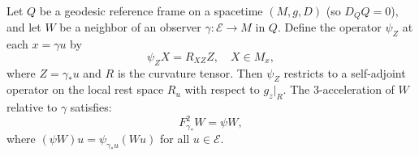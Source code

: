Let $Q$ be a geodesic reference frame on a spacetime $(M, g, D)$ (so $D_Q Q = 0$), and let $W$ be a neighbor of an observer $\gamma: \mathcal{E} \to M$ in $Q$. Define the operator $\psi_Z$ at each $x = \gamma u$ by
$$\psi_Z X = R_{X Z} Z, \quad X \in M_x,$$
where $Z = \gamma_* u$ and $R$ is the curvature tensor. Then $\psi_Z$ restricts to a self-adjoint operator on the local rest space $R_u$ with respect to $g_z|_R$. The 3-acceleration of $W$ relative to $\gamma$ satisfies:
$$F_{\gamma_*}^2 W = \psi W,$$
where $(\psi W)u = \psi_{\gamma_* u}(W u)$ for all $u \in \mathcal{E}$.
